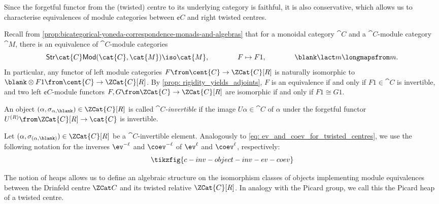 Since the forgetful functor from the (twisted) centre to its underlying category is faithful,
it is also conservative,
which allows us to characterise equivalences of module categories between \(\cent{C}\) and right twisted centres.

\begin{remark}\label{rem:module-funs-have-adjoints}
  Recall from \cref{prop:bicategorical-yoneda-correspondence-monads-and-algebras}
  that for a monoidal category \(\cat{C}\) and a \(\cat{C}\)\hyp{}module category \(\cat{M}\),
  there is an equivalence of \(\cat{C}\)\hyp{}module categories
  \[
    \mathsf{Str}\cat{C}\mathsf{Mod}(\cat{C}, \cat{M}) \iso \cat{M}, \qquad \qquad
    F \mapsto F1, \qquad \qquad
    \blank \lact m \longmapsfrom m.
  \]
  In particular, any functor of left module categories \(F\from \cent{C} \to \ZCat{C}[R]\) is naturally isomorphic to
  \(\blank \otimes F1 \from \cent{C} \to \ZCat{C}[R]\).
  By \cref{prop: rigidity_yields_adjoints}, \(F\) is an equivalence if and only if \(F1 \in \cat{C}\) is invertible,
  and two left \(\cent{C}\)\hyp{}module functors \(F, G \from \ZCat{C} \to \ZCat{C}[R]\) are isomorphic if and only if \(F1 \cong G1\).
\end{remark}

\begin{definition}\label{def: C-invertible}
  An object \((\alpha, \sigma_{\alpha, \blank}) \in \ZCat{C}[R]\) is called \emph{\(\cat{C}\)\hyp{}invertible}
  if the image \(U\alpha \in\cat{C}\) of \(\alpha\) under the forgetful functor \(U^{(R)}\from \ZCat{C}[R] \to\cat{C}\) is invertible.
\end{definition}

\begin{notation}
  Let \((\alpha, \sigma_{(\alpha, \blank)}) \in \ZCat{C}[R]\) be a \(\cat{C}\)\hyp{}invertible element.
  Analogously to \cref{eq: ev_and_coev_for_twisted_centres},
  we use the following notation for the inverses
  \(\ev^{-\ell}\) and \(\coev^{-\ell}\) of \(\ev^{\ell}\) and \(\coev^{\ell}\),
  respectively:
  \[
    \tikzfig{c-inv-object-inv-ev-coev}
  \]
\end{notation}

The notion of heaps allows us to define an algebraic structure on the isomorphism classes of objects implementing module equivalences between the Drinfeld centre \(\ZCat C\) and its twisted relative \(\ZCat{C}[R]\).
In analogy with the Picard group, we call this the Picard heap of a twisted centre.

